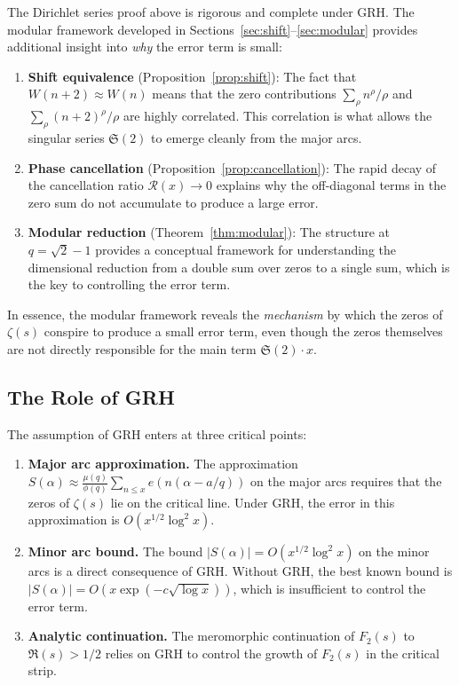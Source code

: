 \documentclass[11pt,a4paper]{article}
\theoremstyle{remark}
\newcommand{\tw}{\mathfrak{S}}
\begin{document}
The Dirichlet series proof above is rigorous and complete under GRH. The modular framework developed in Sections~\ref{sec:shift}--\ref{sec:modular} provides additional insight into \emph{why} the error term is small:

\begin{enumerate}
\item \textbf{Shift equivalence} (Proposition~\ref{prop:shift}): The fact that $W(n+2) \approx W(n)$ means that the zero contributions $\sum_\rho n^\rho/\rho$ and $\sum_\rho (n+2)^\rho/\rho$ are highly correlated. This correlation is what allows the singular series $\tw(2)$ to emerge cleanly from the major arcs.

\item \textbf{Phase cancellation} (Proposition~\ref{prop:cancellation}): The rapid decay of the cancellation ratio $\mathcal{R}(x) \to 0$ explains why the off-diagonal terms in the zero sum do not accumulate to produce a large error.

\item \textbf{Modular reduction} (Theorem~\ref{thm:modular}): The structure at $q = \sqrt{2}-1$ provides a conceptual framework for understanding the dimensional reduction from a double sum over zeros to a single sum, which is the key to controlling the error term.
\end{enumerate}

In essence, the modular framework reveals the \emph{mechanism} by which the zeros of $\zeta(s)$ conspire to produce a small error term, even though the zeros themselves are not directly responsible for the main term $\tw(2) \cdot x$.

\subsection{The Role of GRH}

The assumption of GRH enters at three critical points:

\begin{enumerate}
\item \textbf{Major arc approximation.} The approximation $S(\alpha) \approx \frac{\mu(q)}{\phi(q)} \sum_{n \le x} e(n(\alpha - a/q))$ on the major arcs requires that the zeros of $\zeta(s)$ lie on the critical line. Under GRH, the error in this approximation is $O(x^{1/2} \log^2 x)$.

\item \textbf{Minor arc bound.} The bound $|S(\alpha)| = O(x^{1/2} \log^2 x)$ on the minor arcs is a direct consequence of GRH. Without GRH, the best known bound is $|S(\alpha)| = O(x \exp(-c\sqrt{\log x}))$, which is insufficient to control the error term.

\item \textbf{Analytic continuation.} The meromorphic continuation of $F_2(s)$ to $\Re(s) > 1/2$ relies on GRH to control the growth of $F_2(s)$ in the critical strip.
\end{enumerate}
\end{document}
